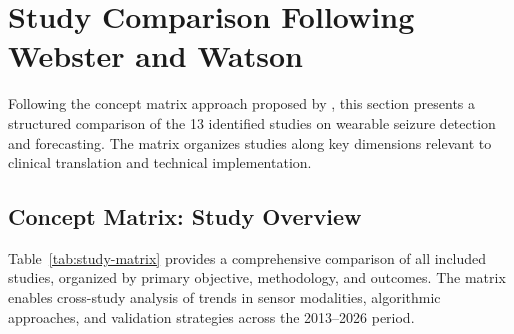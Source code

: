 \section{Study Comparison Following Webster and Watson}
Following the concept matrix approach proposed by \parencite{websterAnalyzingPrepareFuture2002}, this section presents a structured comparison of the 13 identified studies on wearable seizure detection and forecasting. The matrix organizes studies along key dimensions relevant to clinical translation and technical implementation.

\subsection{Concept Matrix: Study Overview}

Table~\ref{tab:study-matrix} provides a comprehensive comparison of all included studies, organized by primary objective, methodology, and outcomes. The matrix enables cross-study analysis of trends in sensor modalities, algorithmic approaches, and validation strategies across the 2013--2026 period.

